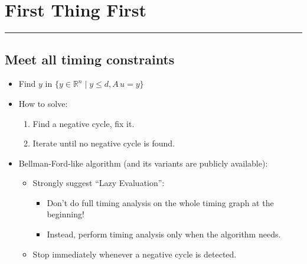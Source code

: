 \documentclass[
]{article}
\providecommand{\tightlist}{%
  \setlength{\itemsep}{0pt}\setlength{\parskip}{0pt}}
\begin{document}

\begin{figure}[h!]
\centering

\end{figure}
\columnsend

\section{First Thing First}\label{first-thing-first}

\begin{center}\rule{0.5\linewidth}{0.5pt}\end{center}

\subsection{Meet all timing constraints}\label{meet-all-timing-constraints}

\begin{itemize}
\tightlist
\item
  Find \(y\) in \(\{y \in \mathbb{R}^n \mid y \leq d, A\,u = y\}\)
\item
  How to solve:

  \begin{enumerate}
  \def\labelenumi{\arabic{enumi}.}
  \tightlist
  \item
    Find a negative cycle, fix it.
  \item
    Iterate until no negative cycle is found.
  \end{enumerate}
\item
  Bellman-Ford-like algorithm (and its variants are publicly
  available):

  \begin{itemize}
  \tightlist
  \item
    Strongly suggest ``Lazy Evaluation'':

    \begin{itemize}
    \tightlist
    \item
      Don't do full timing analysis on the whole timing graph at
      the beginning!
    \item
      Instead, perform timing analysis only when the algorithm
      needs.
    \end{itemize}
  \item
    Stop immediately whenever a negative cycle is detected.
  \end{itemize}
\end{itemize}
\end{document}
